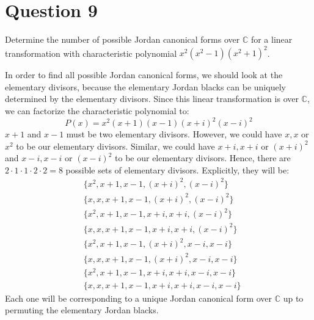 \section{Question 9}

\begin{question}
    Determine the number of possible Jordan canonical forms over $\mathbb{C}$ for a linear transformation with characteristic polynomial $x^2\left(x^2-1\right)\left(x^2+1\right)^2$.
\end{question}

\begin{answer}
    In order to find all possible Jordan canonical forms, we should look at the elementary divisors, because the elementary Jordan blacks can be uniquely determined by the elementary divisors. Since this linear transformation is over $\mathbb{C}$, we can factorize the characteristic polynomial to:
    \begin{equation}
        P(x) = x^2(x+1)(x-1)(x+i)^2(x-i)^2
    \end{equation}
    $x+1$ and $x-1$ must be two elementary divisors. However, we could have $x,x$ or $x^2$ to be our elementary divisors. Similar, we could have $x+i,x+i$ or $(x+i)^2$ and $x-i,x-i$ or $(x-i)^2$ to be our elementary divisors. Hence, there are $2\cdot 1 \cdot 1 \cdot 2 \cdot 2 = 8$ possible sets of elementary divisors. Explicitly, they will be:
    \begin{equation}
        \begin{aligned}
            &\{x^2,x+1,x-1,(x+i)^2,(x-i)^2\}\\
            &\{x,x,x+1,x-1,(x+i)^2,(x-i)^2\}\\
            &\{x^2,x+1,x-1,x+i,x+i,(x-i)^2\}\\
            &\{x,x,x+1,x-1,x+i,x+i,(x-i)^2\}\\
            &\{x^2,x+1,x-1,(x+i)^2,x-i,x-i\}\\
            &\{x,x,x+1,x-1,(x+i)^2,x-i,x-i\}\\
            &\{x^2,x+1,x-1,x+i,x+i,x-i,x-i\}\\
            &\{x,x,x+1,x-1,x+i,x+i,x-i,x-i\}
        \end{aligned}
    \end{equation}
    Each one will be corresponding to a unique Jordan canonical form over $\mathbb{C}$ up to permuting the elementary Jordan blacks.
\end{answer}